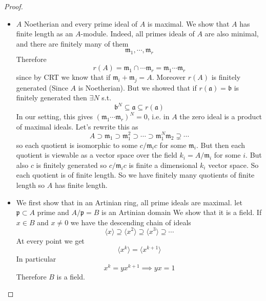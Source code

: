 \documentclass[11pt,a4paper]{article}
\theoremstyle{definition}
\theoremstyle{plain}
\theoremstyle{remark}
\newcommand{\angles}[1]{\langle #1 \rangle}
\begin{document}
\begin{proof}
    \begin{itemize}
        \item[$\impliedby$] $A$ Noetherian and every prime ideal of $A$ is maximal. 
        We show that $A$ has finite length as an $A$-module. Indeed, all primes ideals of $A$ are also minimal, 
        and there are finitely many of them 
        $$\mathfrak{m}_1, \cdots, \mathfrak{m}_r$$
        Therefore 
        $$r(A) = \mathfrak{m}_1 \cap \cdots \mathfrak{m}_r = \mathfrak{m}_1 \cdots \mathfrak{m}_r$$
        since by CRT we know that if $\mathfrak{m}_i + \mathfrak{m}_j = A$. 
        Moreover $r(A)$ is finitely generated (Since $A$ is Noetherian). But we showed that if $r(\mathfrak{a}) = \mathfrak{b}$ is 
        finitely generated then $\exists N$ s.t. 
        $$\mathfrak{b}^N \subseteq \mathfrak{a} \subseteq r(\mathfrak{a})$$
        In our setting, this gives $(\mathfrak{m}_1 \cdots \mathfrak{m}_r)^N = 0$, i.e. in $A$ 
        the zero ideal is a product of maximal ideals. 
        Let's rewrite this as 
        $$A \supset \mathfrak{m}_1 \supset \mathfrak{m}_1^2 \supset \cdots \supset \mathfrak{m}_1^N \mathfrak{m}_2 \supsetneq \cdots$$
        so each quotient is isomorphic to some $c/\mathfrak{m}_i c$ for some $\mathfrak{m}_i$. 
        But then each quotient is viewable as a vector space over the field $k_i = A/\mathfrak{m}_i$ for some $i$. 
        But also $c$ is finitely generated so $c/\mathfrak{m}_i c$ is finite a dimensional $k_i$ vector space. 
        So each quotient is of finite length. So we have finitely many quotients of finite length 
        so $A$ has finite length.
        
        \item[$\impliedby$] We first show that in an Artinian ring, all prime ideals are maximal.
        let $\mathfrak{p} \subset A$ prime and $A/\mathfrak{p} = B$ is an Artinian domain
        We show that it is a field. If $x \in B$ and $x \ne 0$ we have the descending chain of ideals 
        $$\angles{x} \supseteq \angles{x^2} \supseteq \angles{x^3} \supseteq \cdots$$
        At every point we get 
        $$\angles{x^k} = \angles{x^{k+1}}$$
        In particular 
        $$x^k = yx^{k+1} \implies yx = 1$$
        Therefore $B$ is a field. 


\end{itemize}
\end{proof}
\end{document}
